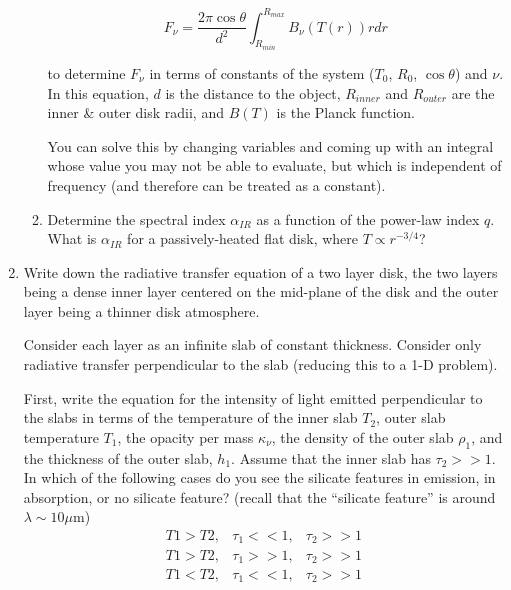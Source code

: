 \documentclass{article}
\begin{document}
\begin{enumerate}
\begin{enumerate}
            \begin{equation}
                F_\nu = \frac{2 \pi \cos\theta}{d^2} \int_{R_{min}}^{R_{max}} B_\nu(T(r)) r dr
            \end{equation}

            to determine $F_\nu$ in terms of constants of the system ($T_0$,
            $R_0$, $\cos \theta$) and $\nu$.  In this equation, $d$ is the
            distance to the object, $R_{inner}$ and $R_{outer}$ are the inner
            \& outer disk radii, and $B(T)$ is the Planck function.  


            You can solve this by changing variables and coming up with an
            integral whose value you may not be able to evaluate, but which is
            independent of frequency (and therefore can be treated as a constant).

        \item Determine the spectral index $\alpha_{IR}$ as a function of the power-law index $q$.
            What is $\alpha_{IR}$ for a passively-heated flat disk, where $T\propto r^{-3/4}$?


    \end{enumerate}

    \item
        Write down the radiative transfer equation of a two layer disk, the two
        layers being a dense inner layer centered on the mid-plane of the disk
        and the outer layer being a thinner disk atmosphere.

        Consider each
        layer as an infinite slab of constant thickness. Consider only
        radiative transfer perpendicular to the slab (reducing this to a 1-D
        problem).

        First, write the equation for the intensity of light emitted
        perpendicular to the slabs in terms of the temperature of the inner
        slab $T_2$, outer slab temperature $T_1$, the opacity per mass $\kappa_\nu$, the
        density of the outer slab $\rho_1$, and the thickness of the outer slab, $h_1$.
        Assume that the inner slab has $\tau_{2}>>1$.  In which of the following
        cases do you see the silicate features in emission, in absorption, or
        no silicate feature?  (recall that the ``silicate feature'' is around
        $\lambda\sim10\mu\mathrm{m}$)
\begin{eqnarray}
T1 > T2, & \tau_1 << 1, & \tau_2 >> 1\\
T1 > T2, & \tau_1 >> 1, & \tau_2 >> 1\\
T1 < T2, & \tau_1 << 1, & \tau_2 >> 1
\end{eqnarray}



\end{enumerate}
\end{document}

